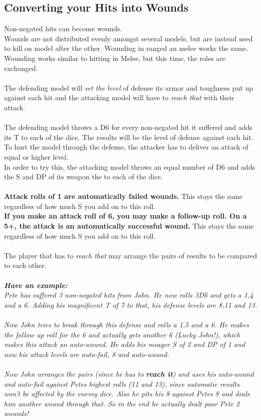 \documentclass[
	11pt,
	toc=bibliography
	]{article}
\begin{document}
\subsection{Converting your Hits into Wounds}\label{convertingHitsToWounds}
Non-negated hits can become wounds.\\
Wounds are not distributed evenly amongst several models, but are instead used to kill on model after the other.
Wounding in ranged an melee works the same.\\
Wounding works similar to hitting in Melee, but this time, the roles are exchanged.\\\\
The defending model will \textit{set the level} of defense its armor and toughness put up against each hit and the attacking model will have to \textit{reach that} with their attack.\\\\
The defending model throws a D6 for every non-negated hit it suffered and adds its T to each of the dice. The results will be the level of defense against each hit. To hurt the model through the defense, the attacker has to deliver an attack of equal or higher level.\\
In order to try this, the attacking model throws an equal number of D6 and adds the S and DP of its weapon the to each of the dice.\\\\
\textbf{Attack rolls of 1 are automatically failed wounds.} This stays the same regardless of how much S you add on to this roll.\\
\textbf{If you make an attack roll of 6, you may make a follow-up roll. On a 5+, the attack is an automatically successful wound.} This stays the same regardless of how much S you add on to this roll.\\\\
The player that has to \textit{reach that} may arrange the pairs of results to be compared to each other.\\\\
\textit{\textbf{Have an example:}\\
Pete has suffered 3 non-negated hits from John. He now rolls 3D6 and gets a 1,4 and a 6. Adding his magnificent T of 7 to that, his defense levels are 8,11 and 13.\\\\
Now John tries to break through this defense and rolls a 1,5 and a 6. He makes the follow up roll for the 6 and actually gets another 6 (Lucky John!), which makes this attack an auto-wound. He adds his meager S of 2 and DP of 1 and now his attack levels are auto-fail, 8 and auto-wound.\\\\
Now John arranges the pairs (since he has to \textbf{reach it}) and uses his auto-wound and auto-fail against Petes highest rolls (11 and 13), since automatic results won't be affected by the enemy dice. Also he pits his 8 against Petes 8 and deals him another wound through that. So in the end he actually dealt poor Pete 2 wounds!}
\end{document}
